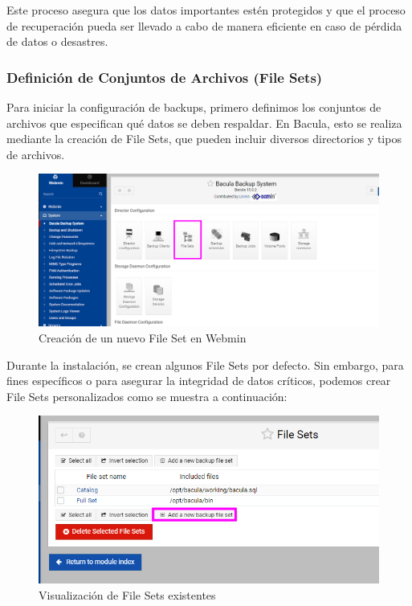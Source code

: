 Este proceso asegura que los datos importantes estén protegidos y que el proceso de recuperación pueda ser llevado a cabo de manera eficiente en caso de pérdida de datos o desastres.


\subsubsection{Definición de Conjuntos de Archivos (File Sets)}
Para iniciar la configuración de backups, primero definimos los conjuntos de archivos que especifican qué datos se deben respaldar. En Bacula, esto se realiza mediante la creación de File Sets, que pueden incluir diversos directorios y tipos de archivos.

\begin{figure}[H]
    \centering
    \includegraphics[width=0.5\linewidth]{instalacionBacula/filesetwebmin.png}
    \caption{Creación de un nuevo File Set en Webmin}
\end{figure}




\begin{minipage}[t]{0.45\textwidth}
    \vspace{0pt} %
    Durante la instalación, se crean algunos File Sets por defecto. Sin embargo, para fines específicos o para asegurar la integridad de datos críticos, podemos crear File Sets personalizados como se muestra a continuación:
   

    \end{minipage}%
    \hfill %
    \begin{minipage}[t]{0.45\textwidth}
    \vspace{0pt} %
    \centering %
      
    \begin{figure}[H]
        \centering
        \includegraphics[width=0.95\linewidth]{instalacionBacula/cpropiofileset.png}
        \caption{Visualización de File Sets existentes}
    \end{figure}
    \end{minipage}


